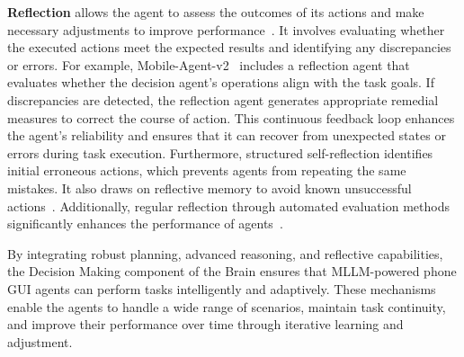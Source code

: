 \noindent\textbf{Reflection}
allows the agent to assess the outcomes of its actions and make necessary adjustments to improve performance~\cite{shinn2024reflexion}. It involves evaluating whether the executed actions meet the expected results and identifying any discrepancies or errors. For example, Mobile-Agent-v2~\cite{wang2024mobileagentv2} includes a reflection agent that evaluates whether the decision agent’s operations align with the task goals. If discrepancies are detected, the reflection agent generates appropriate remedial measures to correct the course of action. This continuous feedback loop enhances the agent's reliability and ensures that it can recover from unexpected states or errors during task execution. Furthermore, structured self-reflection identifies initial erroneous actions, which prevents agents from repeating the same mistakes. It also draws on reflective memory to avoid known unsuccessful actions~\cite{li2023zero}. Additionally, regular reflection through automated evaluation methods significantly enhances the performance of agents~\cite{pan2024autonomous,duan2024uicrit}.



By integrating robust planning, advanced reasoning, and reflective capabilities, the Decision Making component of the Brain ensures that MLLM-powered phone GUI agents can perform tasks intelligently and adaptively. These mechanisms enable the agents to handle a wide range of scenarios, maintain task continuity, and improve their performance over time through iterative learning and adjustment.

